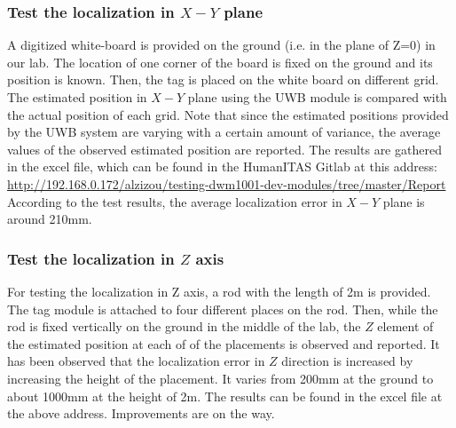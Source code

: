 \documentclass{article}
\begin{document}
\subsubsection{Test the localization in $X-Y$ plane}
A digitized white-board is provided on the ground (i.e. in the plane of Z=0) in our lab. The location of one corner of the board is fixed on the ground and its position is known.
Then, the tag is placed on the white board on different grid. The estimated position in $X-Y$ plane using the UWB module is compared with the actual position of each grid. 
Note that since the estimated positions provided by the UWB system are varying with a certain amount of variance, the average values of the observed estimated position are reported.
The results are gathered in the excel file, which can be found in the HumanITAS Gitlab at this address: 
\url{http://192.168.0.172/alzizou/testing-dwm1001-dev-modules/tree/master/Report}
According to the test results, the average localization error in $X-Y$ plane is around 210mm.

\subsubsection{Test the localization in $Z$ axis}
For testing the localization in Z axis, a rod with the length of 2m is provided. The tag module is attached to four different places on the rod. Then, while the rod is fixed vertically on the ground in the middle of the lab, the $Z$ element of the estimated position at each of of the placements is observed and reported.
It has been observed that the localization error in $Z$ direction is increased by increasing the height of the placement. It varies from 200mm at the ground to about 1000mm at the height of 2m.
The results can be found in the excel file at the above address.
Improvements are on the way. 
\end{document}
